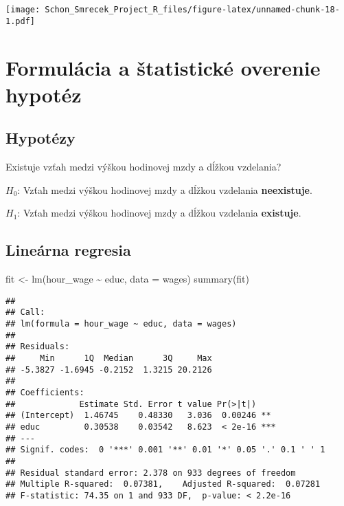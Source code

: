 \documentclass[
]{article}
\newenvironment{Shaded}{\begin{snugshade}}{\end{snugshade}}
\newcommand{\AttributeTok}[1]{\textcolor[rgb]{0.77,0.63,0.00}{#1}}
\newcommand{\FunctionTok}[1]{\textcolor[rgb]{0.00,0.00,0.00}{#1}}
\newcommand{\NormalTok}[1]{#1}
\newcommand{\OtherTok}[1]{\textcolor[rgb]{0.56,0.35,0.01}{#1}}
\newcommand{\SpecialCharTok}[1]{\textcolor[rgb]{0.00,0.00,0.00}{#1}}
\begin{document}
\texttt{[image: Schon\_Smrecek\_Project\_R\_files/figure-latex/unnamed-chunk-18-1.pdf]}

\hypertarget{formuluxe1cia-a-ux161tatistickuxe9-overenie-hypotuxe9z}{%
\section{Formulácia a štatistické overenie
hypotéz}\label{formuluxe1cia-a-ux161tatistickuxe9-overenie-hypotuxe9z}}

\hypertarget{hypotuxe9zy}{%
\subsection{Hypotézy}\label{hypotuxe9zy}}

Existuje vzťah medzi výškou hodinovej mzdy a dĺžkou vzdelania?

\(H_0\): Vzťah medzi výškou hodinovej mzdy a dĺžkou vzdelania
\textbf{neexistuje}.

\(H_1\): Vzťah medzi výškou hodinovej mzdy a dĺžkou vzdelania
\textbf{existuje}.

\hypertarget{lineuxe1rna-regresia}{%
\subsection{Lineárna regresia}\label{lineuxe1rna-regresia}}

\begin{Shaded}
\begin{Highlighting}[]
\NormalTok{fit }\OtherTok{\textless{}{-}} \FunctionTok{lm}\NormalTok{(hour\_wage }\SpecialCharTok{\textasciitilde{}}\NormalTok{ educ, }\AttributeTok{data =}\NormalTok{ wages)}
\FunctionTok{summary}\NormalTok{(fit)}
\end{Highlighting}
\end{Shaded}

\begin{verbatim}
## 
## Call:
## lm(formula = hour_wage ~ educ, data = wages)
## 
## Residuals:
##     Min      1Q  Median      3Q     Max 
## -5.3827 -1.6945 -0.2152  1.3215 20.2126 
## 
## Coefficients:
##             Estimate Std. Error t value Pr(>|t|)    
## (Intercept)  1.46745    0.48330   3.036  0.00246 ** 
## educ         0.30538    0.03542   8.623  < 2e-16 ***
## ---
## Signif. codes:  0 '***' 0.001 '**' 0.01 '*' 0.05 '.' 0.1 ' ' 1
## 
## Residual standard error: 2.378 on 933 degrees of freedom
## Multiple R-squared:  0.07381,    Adjusted R-squared:  0.07281 
## F-statistic: 74.35 on 1 and 933 DF,  p-value: < 2.2e-16
\end{verbatim}
\end{document}
